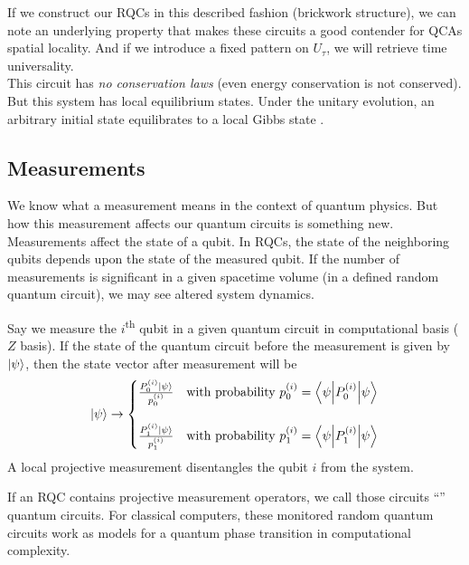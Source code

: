 \documentclass[11pt, oneside, listof=totoc]{scrbook}
\renewcommand{\u}{0}
\renewcommand{\d}{1}
\begin{document}
If we construct our RQCs in this described fashion (\ie brickwork structure), we can note an underlying property that makes these circuits a good contender for QCAs \ie spatial locality. And if we introduce a fixed pattern on \(U_\tau\), we will retrieve time universality.\\

This circuit has \emph{no conservation laws} (even energy conservation is not conserved). But this system has local equilibrium states. Under the unitary evolution, an arbitrary initial state equilibrates to a local Gibbs state \cite{Novikov1971}.

\subsection{Measurements}\label{ssec:measurement}

We know what a measurement means in the context of quantum physics. But how this measurement affects our quantum circuits is something new. Measurements affect the state of a qubit. In RQCs, the state of the neighboring qubits depends upon the state of the measured qubit. If the number of measurements is significant in a given spacetime volume (\ie in a defined random quantum circuit), we may see altered system dynamics.

Say we measure the \(i\)\textsuperscript{th} qubit in a given quantum circuit in computational basis (\ie \(Z\) basis). If the state of the quantum circuit before the measurement is given by \(\ket{\psi}\), then the state vector after measurement will be
\begin{equation}
    \ket{\psi} \to \begin{cases}
        \frac{P_\u^{(i)} \ket{\psi}}{p_\u^{(i)}} & \text{with probability \(p_\u^{(i)} = \ev**{P_\u^{(i)}}{\psi}\)} \\[4ex]
        \frac{P_\d^{(i)} \ket{\psi}}{p_\d^{(i)}} & \text{with probability \(p_\d^{(i)} = \ev**{P_\d^{(i)}}{\psi}\)}
    \end{cases}
\end{equation}
A local projective measurement disentangles the qubit \(i\) from the system.

If an RQC contains projective measurement operators, we call those circuits ``'' quantum circuits. For classical computers, these monitored random quantum circuits work as models for a quantum phase transition in computational complexity.\cite{Fisher2023}
\end{document}
